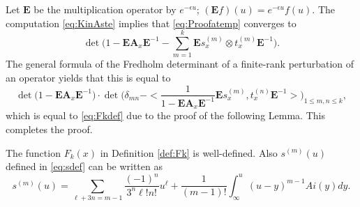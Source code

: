 \documentclass[11pt]{article}
\begin{document}
Let $\mathbf{E}$ be the multiplication operator by $e^{-\epsilon
u}$; $(\mathbf{E}f)(u) = e^{-\epsilon u} f(u)$. The computation
\eqref{eq:KinAste} implies that \eqref{eq:Proofatemp} converges to
\begin{equation}
  \det \bigl(1- \mathbf{E}\mathbf{A}_x \mathbf{E}^{-1} -\sum_{m=1}^k
  \mathbf{E} s^{(m)}_x \otimes t^{(m)}_x \mathbf{E}^{-1} \bigr).
\end{equation}
The general formula of the Fredholm determinant of a finite-rank
perturbation of an operator yields that this is equal to
\begin{equation}
  \det \bigl(1- \mathbf{E}\mathbf{A}_x \mathbf{E}^{-1} \bigr)
  \cdot \det \biggl( \delta_{mn} - < \frac{1}{1-\mathbf{E}\mathbf{A}_x
  \mathbf{E}^{-1}}  \mathbf{E} s^{(m)}_x , t^{(n)}_x \mathbf{E}^{-1} >
   \biggr)_{1\le m,n\le k},
\end{equation}
which is equal to \eqref{eq:Fkdef} due to the proof of the
following Lemma. This completes the proof.


\begin{lemma}\label{lem:Fk}
The function $F_k(x)$ in Definition \ref{def:Fk} is well-defined.
Also $s^{(m)}(u)$ defined in \eqref{eq:sdef} can be written as
\begin{equation}
  s^{(m)}(u) =  \sum_{\ell+3n = m-1} \frac{(-1)^n}{3^n \ell ! n!}
  u^\ell + \frac1{(m-1)!} \int_\infty^u (u-y)^{m-1} Ai(y)dy.
\end{equation}
\end{lemma}
\end{document}
